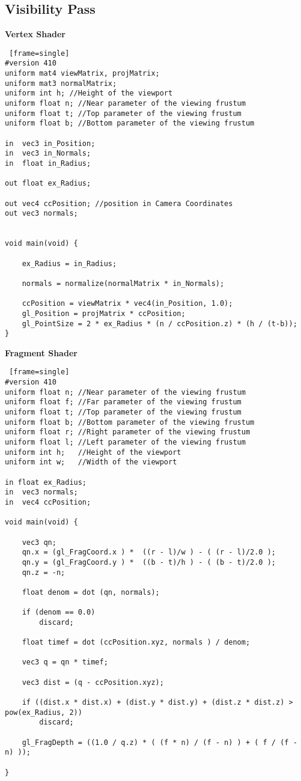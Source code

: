 \subsection{Visibility Pass}
\textbf{Vertex Shader}
\begin{lstlisting} [frame=single]
#version 410
uniform mat4 viewMatrix, projMatrix;
uniform mat3 normalMatrix;
uniform int h; //Height of the viewport
uniform float n; //Near parameter of the viewing frustum
uniform float t; //Top parameter of the viewing frustum
uniform float b; //Bottom parameter of the viewing frustum

in  vec3 in_Position;
in 	vec3 in_Normals;
in  float in_Radius;

out float ex_Radius;

out vec4 ccPosition; //position in Camera Coordinates
out vec3 normals;


void main(void) {

	ex_Radius = in_Radius;

	normals = normalize(normalMatrix * in_Normals);

	ccPosition = viewMatrix * vec4(in_Position, 1.0);
	gl_Position = projMatrix * ccPosition;
	gl_PointSize = 2 * ex_Radius * (n / ccPosition.z) * (h / (t-b));
}
\end{lstlisting}
\newpage

\textbf{Fragment Shader}
\begin{lstlisting} [frame=single]
#version 410
uniform float n; //Near parameter of the viewing frustum
uniform float f; //Far parameter of the viewing frustum
uniform float t; //Top parameter of the viewing frustum
uniform float b; //Bottom parameter of the viewing frustum
uniform float r; //Right parameter of the viewing frustum
uniform float l; //Left parameter of the viewing frustum
uniform int h; 	 //Height of the viewport
uniform int w; 	 //Width of the viewport

in float ex_Radius;
in  vec3 normals;
in 	vec4 ccPosition;

void main(void) {

	vec3 qn;
	qn.x = (gl_FragCoord.x ) *  ((r - l)/w ) - ( (r - l)/2.0 );
	qn.y = (gl_FragCoord.y ) *  ((b - t)/h ) - ( (b - t)/2.0 );
	qn.z = -n;

	float denom = dot (qn, normals);

	if (denom == 0.0)
		discard;

	float timef = dot (ccPosition.xyz, normals ) / denom;

	vec3 q = qn * timef;
	
	vec3 dist = (q - ccPosition.xyz);

	if ((dist.x * dist.x) + (dist.y * dist.y) + (dist.z * dist.z) > pow(ex_Radius, 2))
		discard;

	gl_FragDepth = ((1.0 / q.z) * ( (f * n) / (f - n) ) + ( f / (f - n) ));

}
\end{lstlisting}
\newpage

